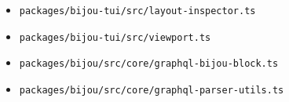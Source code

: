 \begin{itemize}
\item
  \texttt{p\allowbreak{}a\allowbreak{}c\allowbreak{}k\allowbreak{}a\allowbreak{}g\allowbreak{}e\allowbreak{}s\allowbreak{}/\allowbreak{}b\allowbreak{}i\allowbreak{}j\allowbreak{}o\allowbreak{}u\allowbreak{}-\allowbreak{}t\allowbreak{}u\allowbreak{}i\allowbreak{}/\allowbreak{}s\allowbreak{}r\allowbreak{}c\allowbreak{}/\allowbreak{}l\allowbreak{}a\allowbreak{}y\allowbreak{}o\allowbreak{}u\allowbreak{}t\allowbreak{}-\allowbreak{}i\allowbreak{}n\allowbreak{}s\allowbreak{}p\allowbreak{}e\allowbreak{}c\allowbreak{}t\allowbreak{}o\allowbreak{}r\allowbreak{}.\allowbreak{}t\allowbreak{}s}
\item
  \texttt{p\allowbreak{}a\allowbreak{}c\allowbreak{}k\allowbreak{}a\allowbreak{}g\allowbreak{}e\allowbreak{}s\allowbreak{}/\allowbreak{}b\allowbreak{}i\allowbreak{}j\allowbreak{}o\allowbreak{}u\allowbreak{}-\allowbreak{}t\allowbreak{}u\allowbreak{}i\allowbreak{}/\allowbreak{}s\allowbreak{}r\allowbreak{}c\allowbreak{}/\allowbreak{}v\allowbreak{}i\allowbreak{}e\allowbreak{}w\allowbreak{}p\allowbreak{}o\allowbreak{}r\allowbreak{}t\allowbreak{}.\allowbreak{}t\allowbreak{}s}
\item
  \texttt{p\allowbreak{}a\allowbreak{}c\allowbreak{}k\allowbreak{}a\allowbreak{}g\allowbreak{}e\allowbreak{}s\allowbreak{}/\allowbreak{}b\allowbreak{}i\allowbreak{}j\allowbreak{}o\allowbreak{}u\allowbreak{}/\allowbreak{}s\allowbreak{}r\allowbreak{}c\allowbreak{}/\allowbreak{}c\allowbreak{}o\allowbreak{}r\allowbreak{}e\allowbreak{}/\allowbreak{}g\allowbreak{}r\allowbreak{}a\allowbreak{}p\allowbreak{}h\allowbreak{}q\allowbreak{}l\allowbreak{}-\allowbreak{}b\allowbreak{}i\allowbreak{}j\allowbreak{}o\allowbreak{}u\allowbreak{}-\allowbreak{}b\allowbreak{}l\allowbreak{}o\allowbreak{}c\allowbreak{}k\allowbreak{}.\allowbreak{}t\allowbreak{}s}
\item
  \texttt{p\allowbreak{}a\allowbreak{}c\allowbreak{}k\allowbreak{}a\allowbreak{}g\allowbreak{}e\allowbreak{}s\allowbreak{}/\allowbreak{}b\allowbreak{}i\allowbreak{}j\allowbreak{}o\allowbreak{}u\allowbreak{}/\allowbreak{}s\allowbreak{}r\allowbreak{}c\allowbreak{}/\allowbreak{}c\allowbreak{}o\allowbreak{}r\allowbreak{}e\allowbreak{}/\allowbreak{}g\allowbreak{}r\allowbreak{}a\allowbreak{}p\allowbreak{}h\allowbreak{}q\allowbreak{}l\allowbreak{}-\allowbreak{}p\allowbreak{}a\allowbreak{}r\allowbreak{}s\allowbreak{}e\allowbreak{}r\allowbreak{}-\allowbreak{}u\allowbreak{}t\allowbreak{}i\allowbreak{}l\allowbreak{}s\allowbreak{}.\allowbreak{}t\allowbreak{}s}
\end{itemize}

